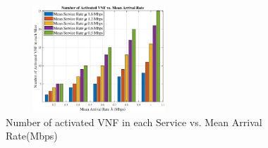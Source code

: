 \documentclass[lettersize,journal]{IEEEtran}
\begin{document}
\begin{figure}
\centering
  \captionsetup{justification=centering}
       \includegraphics[width=7cm,height=4cm]{vnfNum1.eps}
  \caption{Number of activated VNF in each Service vs. Mean Arrival Rate(Mbps)}
  \label{fig:4}
\end{figure}
\end{document}

